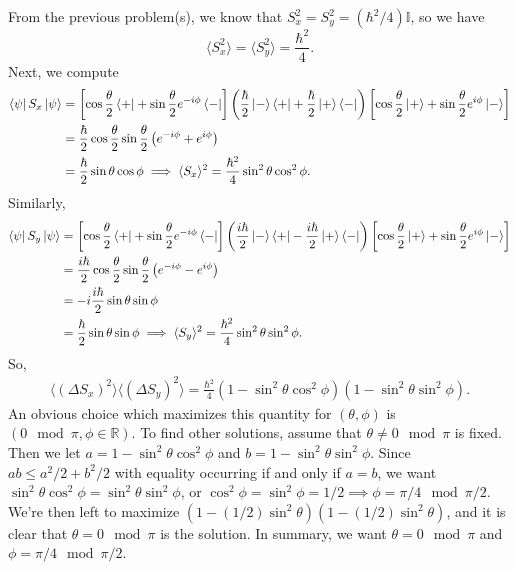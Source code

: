 \documentclass{article}
\theoremstyle{definition}
\newcommand{\f}[2]{\frac{#1}{#2}}
\newcommand{\lp}{\left(}
\newcommand{\rp}{\right)}
\newcommand{\lb}{\left[}
\newcommand{\rb}{\right]}
\begin{document}
From the previous problem(s), we know that $S_x^2 = S_y^2 = (\hbar^2/4)\mathbb{I}$, so we have
\begin{equation*}
\langle S_x^2 \rangle = \langle S_y^2 \rangle = \f{\hbar^2}{4}.
\end{equation*}
Next, we compute
\begin{align*}
\bra{\psi} S_x \ket{\psi} 
&= \lb \cos\f{\theta}{2} \bra{+} + \sin\f{\theta}{2}e^{-i\phi} \bra{-} \rb \lp \f{\hbar}{2} \ket{-}\bra{+} + \f{\hbar}{2}\ket{+}\bra{-}  \rp \lb  \cos\f{\theta}{2} \ket{+} + \sin\f{\theta}{2}e^{i\phi} \ket{-} \rb \\
&= \f{\hbar}{2}\cos\f{\theta}{2}\sin\f{\theta}{2}\lp e^{-i\phi} + e^{i\phi} \rp  \\
&= \f{\hbar}{2}\sin\theta \cos\phi \implies \langle S_x\rangle^2 = \f{\hbar^2}{4}\sin^2\theta \cos^2\phi.
\end{align*}
Similarly, 
\begin{align*}
\bra{\psi} S_y \ket{\psi} 
&= \lb \cos\f{\theta}{2} \bra{+} + \sin\f{\theta}{2}e^{-i\phi} \bra{-} \rb 
\lp \f{i\hbar}{2} \ket{-}\bra{+} - \f{i\hbar}{2}\ket{+}\bra{-}  \rp \lb  \cos\f{\theta}{2} \ket{+} + \sin\f{\theta}{2}e^{i\phi} \ket{-} \rb \\
&= \f{i\hbar}{2}\cos\f{\theta}{2}\sin\f{\theta}{2}\lp e^{-i\phi} - e^{i\phi} \rp\\
&= -i\f{i\hbar}{2}\sin\theta \sin\phi \\
&= \f{\hbar}{2}\sin\theta\sin\phi \implies \langle S_y\rangle^2 = \f{\hbar^2}{4}\sin^2\theta \sin^2\phi.
\end{align*}
So, 
\begin{align*}
\langle (\Delta S_x)^2\rangle \langle (\Delta S_y)^2\rangle = \f{\hbar^2}{4}\lp 1- \sin^2\theta\cos^2\phi \rp \lp 1 -\sin^2\theta\sin^2\phi \rp.
\end{align*}
An obvious choice which maximizes this quantity for $(\theta,\phi)$ is $(0\mod \pi, \phi\in \mathbb{R})$. To find other solutions, assume that $\theta \neq 0\mod \pi$ is fixed. Then we let $a = 1- \sin^2\theta\cos^2\phi$ and $b = 1 -\sin^2\theta\sin^2\phi$. Since $ab \leq a^2/2+b^2/2$ with equality occurring if and only if $a=b$, we want $\sin^2\theta \cos^2\phi = \sin^2\theta\sin^2\phi$, or $\cos^2\phi = \sin^2\phi = 1/2 \implies \phi = \pi/4 \mod \pi/2$. We're then left to maximize $\lp 1- (1/2)\sin^2\theta\rp \lp 1 -(1/2)\sin^2\theta \rp$, and it is clear that $\theta = 0\mod \pi$ is the solution. In summary, we want $\theta = 0\mod \pi$ and $\phi = \pi/4 \mod \pi/2 $.\\
\end{document}
